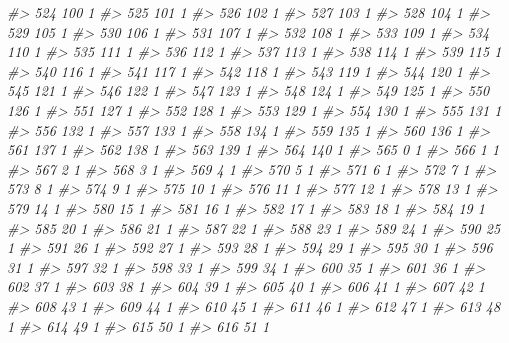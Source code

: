 \documentclass[]{article}
\newenvironment{Shaded}{\begin{snugshade}}{\end{snugshade}}
\newcommand{\CommentTok}[1]{\textcolor[rgb]{0.56,0.35,0.01}{\textit{#1}}}
\begin{document}
\begin{Shaded}
\begin{Highlighting}[]
\CommentTok{#> 524  100  1}
\CommentTok{#> 525  101  1}
\CommentTok{#> 526  102  1}
\CommentTok{#> 527  103  1}
\CommentTok{#> 528  104  1}
\CommentTok{#> 529  105  1}
\CommentTok{#> 530  106  1}
\CommentTok{#> 531  107  1}
\CommentTok{#> 532  108  1}
\CommentTok{#> 533  109  1}
\CommentTok{#> 534  110  1}
\CommentTok{#> 535  111  1}
\CommentTok{#> 536  112  1}
\CommentTok{#> 537  113  1}
\CommentTok{#> 538  114  1}
\CommentTok{#> 539  115  1}
\CommentTok{#> 540  116  1}
\CommentTok{#> 541  117  1}
\CommentTok{#> 542  118  1}
\CommentTok{#> 543  119  1}
\CommentTok{#> 544  120  1}
\CommentTok{#> 545  121  1}
\CommentTok{#> 546  122  1}
\CommentTok{#> 547  123  1}
\CommentTok{#> 548  124  1}
\CommentTok{#> 549  125  1}
\CommentTok{#> 550  126  1}
\CommentTok{#> 551  127  1}
\CommentTok{#> 552  128  1}
\CommentTok{#> 553  129  1}
\CommentTok{#> 554  130  1}
\CommentTok{#> 555  131  1}
\CommentTok{#> 556  132  1}
\CommentTok{#> 557  133  1}
\CommentTok{#> 558  134  1}
\CommentTok{#> 559  135  1}
\CommentTok{#> 560  136  1}
\CommentTok{#> 561  137  1}
\CommentTok{#> 562  138  1}
\CommentTok{#> 563  139  1}
\CommentTok{#> 564  140  1}
\CommentTok{#> 565    0  1}
\CommentTok{#> 566    1  1}
\CommentTok{#> 567    2  1}
\CommentTok{#> 568    3  1}
\CommentTok{#> 569    4  1}
\CommentTok{#> 570    5  1}
\CommentTok{#> 571    6  1}
\CommentTok{#> 572    7  1}
\CommentTok{#> 573    8  1}
\CommentTok{#> 574    9  1}
\CommentTok{#> 575   10  1}
\CommentTok{#> 576   11  1}
\CommentTok{#> 577   12  1}
\CommentTok{#> 578   13  1}
\CommentTok{#> 579   14  1}
\CommentTok{#> 580   15  1}
\CommentTok{#> 581   16  1}
\CommentTok{#> 582   17  1}
\CommentTok{#> 583   18  1}
\CommentTok{#> 584   19  1}
\CommentTok{#> 585   20  1}
\CommentTok{#> 586   21  1}
\CommentTok{#> 587   22  1}
\CommentTok{#> 588   23  1}
\CommentTok{#> 589   24  1}
\CommentTok{#> 590   25  1}
\CommentTok{#> 591   26  1}
\CommentTok{#> 592   27  1}
\CommentTok{#> 593   28  1}
\CommentTok{#> 594   29  1}
\CommentTok{#> 595   30  1}
\CommentTok{#> 596   31  1}
\CommentTok{#> 597   32  1}
\CommentTok{#> 598   33  1}
\CommentTok{#> 599   34  1}
\CommentTok{#> 600   35  1}
\CommentTok{#> 601   36  1}
\CommentTok{#> 602   37  1}
\CommentTok{#> 603   38  1}
\CommentTok{#> 604   39  1}
\CommentTok{#> 605   40  1}
\CommentTok{#> 606   41  1}
\CommentTok{#> 607   42  1}
\CommentTok{#> 608   43  1}
\CommentTok{#> 609   44  1}
\CommentTok{#> 610   45  1}
\CommentTok{#> 611   46  1}
\CommentTok{#> 612   47  1}
\CommentTok{#> 613   48  1}
\CommentTok{#> 614   49  1}
\CommentTok{#> 615   50  1}
\CommentTok{#> 616   51  1}

\end{Highlighting}
\end{Shaded}
\end{document}
